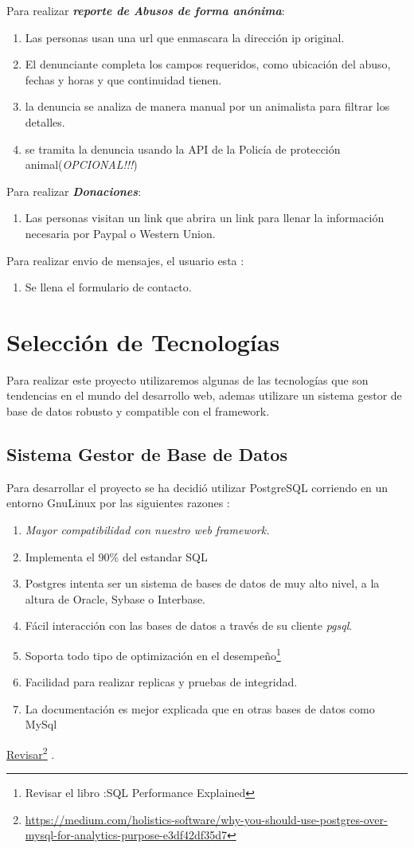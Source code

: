 \documentclass[paper=a4, fontsize=12pt]{article} 		%
\newcommand\fnurl[2]{%
\href{#2}{#1}\footnote{\url{#2}}%
}
\numberwithin{equation}{section}						%
\numberwithin{table}{section} 							%
\begin{document}
Para realizar \textit{\textbf{reporte de Abusos de forma anónima}}:
\begin{enumerate}
\item Las personas usan una url que enmascara la dirección ip original. 
\item El denunciante completa los campos requeridos, como ubicación del abuso, fechas y horas y que continuidad tienen.
\item la denuncia se analiza de manera manual por un animalista para filtrar los detalles.
\item se tramita la denuncia usando la API de la Policía de protección animal(\textit{OPCIONAL!!!})
\end{enumerate}

Para realizar \textit{\textbf{Donaciones}}:
\begin{enumerate}
\item Las personas visitan un link que abrira un link para llenar la información necesaria por Paypal o Western Union. 
\end{enumerate}

Para realizar envio de mensajes, el usuario  esta :
\begin{enumerate}
\item Se llena el formulario de contacto. 
\end{enumerate}


\section{Selección de Tecnologías}
Para realizar este proyecto utilizaremos algunas de las tecnologías que son tendencias en el mundo del desarrollo web, ademas utilizare un sistema gestor de base de datos robusto y compatible con el framework.
\subsection{Sistema Gestor de Base de Datos}
Para desarrollar el proyecto se ha decidió utilizar PostgreSQL corriendo en un entorno Gnu\-Linux por las siguientes razones :
\begin{enumerate}
\item \emph{ Mayor compatibilidad con nuestro web framework.}
\item Implementa el 90\% del estandar SQL
\item Postgres intenta ser un sistema de bases de datos de muy alto nivel, a la altura de Oracle, Sybase o Interbase.
\item Fácil interacción con las bases de datos a través de su cliente \emph{pgsql}.
\item Soporta todo tipo de optimización en el desempeño\footnote{Revisar el libro :SQL Performance Explained}
\item Facilidad para realizar replicas y pruebas de integridad. 
\item La documentación es mejor explicada que en otras bases de datos como MySql
\end{enumerate}
\fnurl{Revisar}{https://medium.com/holistics-software/why-you-should-use-postgres-over-mysql-for-analytics-purpose-e3df42df35d7}.
  
\end{document}
